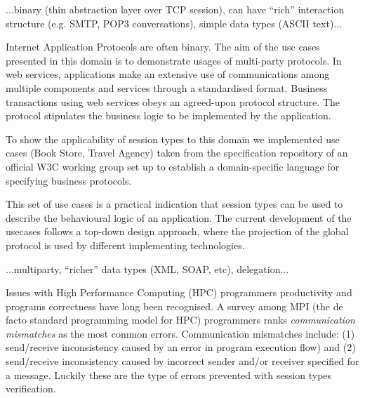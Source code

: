 ...binary (thin abstraction layer over TCP session), can have ``rich'' interaction structure (e.g. SMTP, POP3 conversations), simple data types (ASCII text)...




Internet Application Protocols are often binary. The aim of the use cases presented in this domain is to demonstrate usages of multi-party protocols. In web services, applications make an extensive use of communications among multiple components and services through a standardised format. Business transactions using web services
obeys an agreed-upon protocol structure. The protocol stipulates the business logic to be implemented by the application.

To show the applicability of session types to this domain we implemented use cases (Book Store, Travel Agency) taken from the specification repository of an official W3C working group set up to establish a domain-specific language for specifying business protocols.

This set of use cases is a practical indication that session types can be used to describe the behavioural logic of an application. The current development of the usecases follows a top-down design approach, where the projection of the global protocol is used by different
implementing technologies.

...multiparty, ``richer'' data types (XML, SOAP, etc), delegation...



Issues with High Performance Computing (HPC) programmers productivity and programs correctness have long been recognised. A survey among MPI (the de facto standard programming model for HPC) programmers \cite{MPIErrors} ranks \textit{communication mismatches} as the most common errors. Communication mismatches include: (1) send/receive inconsistency caused by an error in program execution flow) and (2) send/receive inconsistency caused by incorrect sender and/or receiver specified for a message. Luckily these are the type of errors prevented with session types verification.


